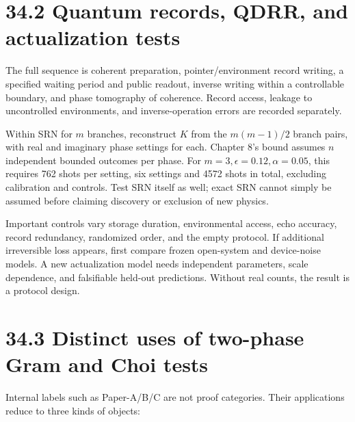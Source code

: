 \documentclass[
  11pt,
  oneside]{book}
\begin{document}
\section{34.2 Quantum records, QDRR, and actualization tests}

The full sequence is coherent preparation, pointer/environment record
writing, a specified waiting period and public readout, inverse writing
within a controllable boundary, and phase tomography of coherence.
Record access, leakage to uncontrolled environments, and
inverse-operation errors are recorded separately.

Within SRN for \(m\) branches, reconstruct \(K\) from the \(m(m-1)/2\)
branch pairs, with real and imaginary phase settings for each. Chapter
8's bound assumes \(n\) independent bounded outcomes per phase. For
\(m=3,\epsilon=0.12,\alpha=0.05\), this requires 762 shots per setting,
six settings and 4572 shots in total, excluding calibration and
controls. Test SRN itself as well; exact SRN cannot simply be assumed
before claiming discovery or exclusion of new physics.

Important controls vary storage duration, environmental access, echo
accuracy, record redundancy, randomized order, and the empty protocol.
If additional irreversible loss appears, first compare frozen
open-system and device-noise models. A new actualization model needs
independent parameters, scale dependence, and falsifiable held-out
predictions. Without real counts, the result is a protocol design.

\section{34.3 Distinct uses of two-phase Gram and Choi tests}

Internal labels such as Paper-A/B/C are not proof categories. Their
applications reduce to three kinds of objects:
\end{document}
